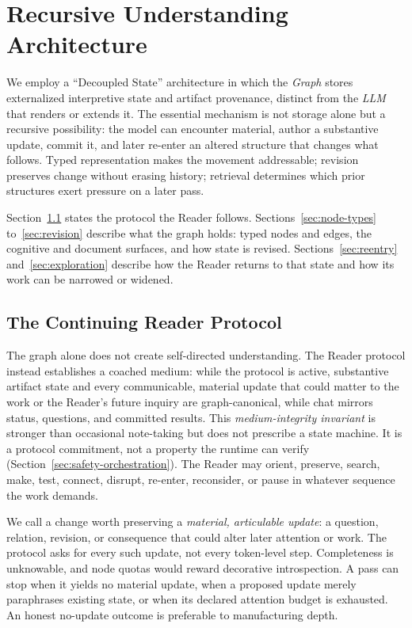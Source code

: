 \section{Recursive Understanding Architecture}
\label{sec:architecture}

We employ a ``Decoupled State'' architecture in which the \emph{Graph} stores externalized interpretive state and artifact provenance, distinct from the \emph{LLM} that renders or extends it. The essential mechanism is not storage alone but a recursive possibility: the model can encounter material, author a substantive update, commit it, and later re-enter an altered structure that changes what follows. Typed representation makes the movement addressable; revision preserves change without erasing history; retrieval determines which prior structures exert pressure on a later pass.

Section~\ref{sec:continuing-reader} states the protocol the Reader follows. Sections~\ref{sec:node-types} to~\ref{sec:revision} describe what the graph holds: typed nodes and edges, the cognitive and document surfaces, and how state is revised. Sections~\ref{sec:reentry} and~\ref{sec:exploration} describe how the Reader returns to that state and how its work can be narrowed or widened.

\subsection{The Continuing Reader Protocol}
\label{sec:continuing-reader}

The graph alone does not create self-directed understanding. The Reader protocol instead establishes a coached medium: while the protocol is active, substantive artifact state and every communicable, material update that could matter to the work or the Reader's future inquiry are graph-canonical, while chat mirrors status, questions, and committed results. This \emph{medium-integrity invariant} is stronger than occasional note-taking but does not prescribe a state machine. It is a protocol commitment, not a property the runtime can verify (Section~\ref{sec:safety-orchestration}). The Reader may orient, preserve, search, make, test, connect, disrupt, re-enter, reconsider, or pause in whatever sequence the work demands.

We call a change worth preserving a \emph{material, articulable update}: a question, relation, revision, or consequence that could alter later attention or work. The protocol asks for every such update, not every token-level step. Completeness is unknowable, and node quotas would reward decorative introspection. A pass can stop when it yields no material update, when a proposed update merely paraphrases existing state, or when its declared attention budget is exhausted. An honest no-update outcome is preferable to manufacturing depth.

